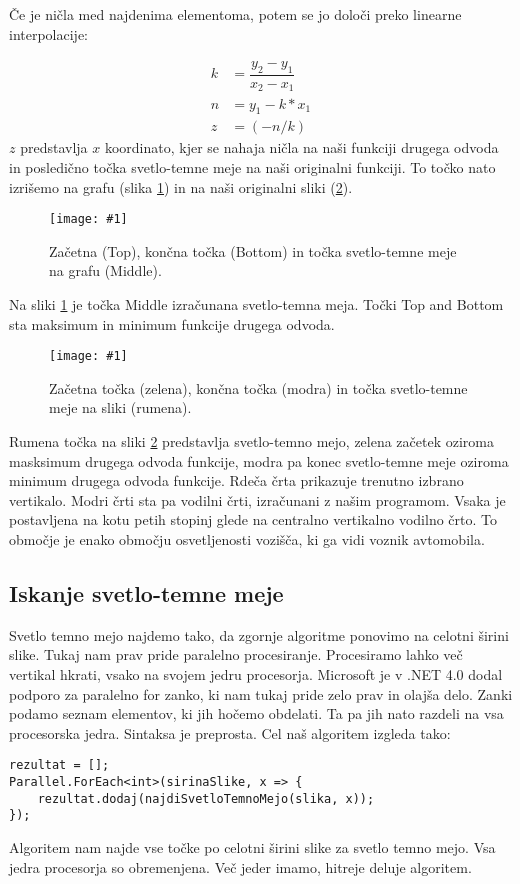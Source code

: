 \documentclass[oneside, a4paper, 12pt]{book}
\newcommand{\slika}[3]{
	\begin{figure}
	\begin{center}
	\texttt{[image: \#1]}
	\end{center}
	\vspace{-20pt}
	\caption{#2}
	\label{#3}
	\end{figure}
}
\begin{document}
Če je ničla med najdenima elementoma, potem se jo določi preko linearne interpolacije:

\begin{align}
k &= \dfrac{y_2-y_1}{x_2-x_1}  \nonumber\\
n &= y_1-k*x_1 \\
z &= (-n/k) \nonumber
\end{align} 
$z$ predstavlja $x$ koordinato, kjer se nahaja ničla na naši funkciji drugega odvoda in posledično točka svetlo-temne meje na naši originalni funkciji. To točko nato izrišemo na grafu (slika \ref{pic:svet-tem}) in na naši originalni sliki (\ref{pic:svet-tem2}).

\slika{slike/svetlo-temna-meja.jpg}{Začetna (Top), končna točka (Bottom) in točka svetlo-temne meje na grafu (Middle).}{pic:svet-tem}

Na sliki \ref{pic:svet-tem} je točka Middle izračunana svetlo-temna meja. Točki Top and Bottom sta maksimum in minimum funkcije drugega odvoda. 


\slika{slike/svetlo-temna-meja-orig-crop.jpg}{Začetna točka (zelena), končna točka (modra) in točka svetlo-temne meje na sliki (rumena).}{pic:svet-tem2}

Rumena točka na sliki \ref{pic:svet-tem2} predstavlja svetlo-temno mejo, zelena začetek oziroma masksimum drugega odvoda funkcije, modra pa konec svetlo-temne meje oziroma minimum drugega odvoda funkcije. Rdeča črta prikazuje trenutno izbrano vertikalo. Modri črti sta pa vodilni črti, izračunani z našim programom. Vsaka je postavljena na kotu petih stopinj glede na centralno vertikalno vodilno črto. To območje je enako območju osvetljenosti vozišča, ki ga vidi voznik avtomobila.


\subsection{Iskanje svetlo-temne meje}
\label{ch:iskanj-sv-t-m}
Svetlo temno mejo najdemo tako, da zgornje algoritme ponovimo na celotni širini slike. Tukaj nam prav pride paralelno procesiranje. Procesiramo lahko več vertikal hkrati, vsako na svojem jedru procesorja. Microsoft je v .NET 4.0 dodal podporo za paralelno for zanko, ki nam tukaj pride zelo prav in olajša delo. Zanki podamo seznam elementov, ki jih hočemo obdelati. Ta pa jih nato razdeli na vsa procesorska jedra. Sintaksa je preprosta. Cel naš algoritem izgleda tako:
\begin{samepage}
\begin{verbatim}
rezultat = [];
Parallel.ForEach<int>(sirinaSlike, x => {
    rezultat.dodaj(najdiSvetloTemnoMejo(slika, x));
});
\end{verbatim}
\end{samepage}
Algoritem nam najde vse točke po celotni širini slike za svetlo temno mejo. Vsa jedra procesorja so obremenjena. Več jeder imamo, hitreje deluje algoritem.
\end{document}

